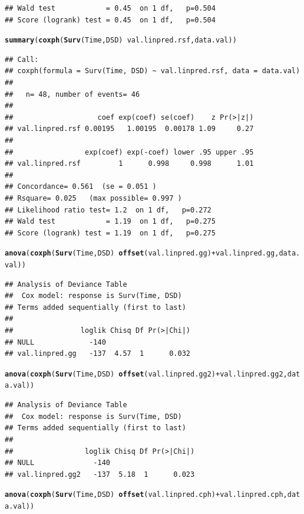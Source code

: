 \documentclass{article}\usepackage[]{graphicx}\usepackage[]{color}
\makeatletter
\newcommand{\hlopt}[1]{\textcolor[rgb]{0,0,0}{#1}}%
\newcommand{\hlstd}[1]{\textcolor[rgb]{0.345,0.345,0.345}{#1}}%
\newcommand{\hlkwd}[1]{\textcolor[rgb]{0.737,0.353,0.396}{\textbf{#1}}}%
\newenvironment{kframe}{%
 \def\at@end@of@kframe{}%
 \ifinner\ifhmode%
  \def\at@end@of@kframe{\end{minipage}}%
  \begin{minipage}{\columnwidth}%
 \fi\fi%
 \def\FrameCommand##1{\hskip\@totalleftmargin \hskip-\fboxsep
 \colorbox{shadecolor}{##1}\hskip-\fboxsep
     \hskip-\linewidth \hskip-\@totalleftmargin \hskip\columnwidth}%
 \MakeFramed {\advance\hsize-\width
   \@totalleftmargin\z@ \linewidth\hsize
   \@setminipage}}%
 {\par\unskip\endMakeFramed%
 \at@end@of@kframe}
\newenvironment{knitrout}{}{} %
\makeatother
\begin{document}
\begin{knitrout}
\begin{kframe}
\begin{verbatim}
## Wald test            = 0.45  on 1 df,   p=0.504
## Score (logrank) test = 0.45  on 1 df,   p=0.504
\end{verbatim}
\begin{alltt}
\hlkwd{summary}\hlstd{(}\hlkwd{coxph}\hlstd{(}\hlkwd{Surv}\hlstd{(Time, DSD)} \hlopt{~} \hlstd{val.linpred.rsf, data.val))}
\end{alltt}
\begin{verbatim}
## Call:
## coxph(formula = Surv(Time, DSD) ~ val.linpred.rsf, data = data.val)
## 
##   n= 48, number of events= 46 
## 
##                    coef exp(coef) se(coef)    z Pr(>|z|)
## val.linpred.rsf 0.00195   1.00195  0.00178 1.09     0.27
## 
##                 exp(coef) exp(-coef) lower .95 upper .95
## val.linpred.rsf         1      0.998     0.998      1.01
## 
## Concordance= 0.561  (se = 0.051 )
## Rsquare= 0.025   (max possible= 0.997 )
## Likelihood ratio test= 1.2  on 1 df,   p=0.272
## Wald test            = 1.19  on 1 df,   p=0.275
## Score (logrank) test = 1.19  on 1 df,   p=0.275
\end{verbatim}
\begin{alltt}
\hlkwd{anova}\hlstd{(}\hlkwd{coxph}\hlstd{(}\hlkwd{Surv}\hlstd{(Time, DSD)} \hlopt{~} \hlkwd{offset}\hlstd{(val.linpred.gg)} \hlopt{+} \hlstd{val.linpred.gg, data.val))}
\end{alltt}
\begin{verbatim}
## Analysis of Deviance Table
##  Cox model: response is Surv(Time, DSD)
## Terms added sequentially (first to last)
## 
##                loglik Chisq Df Pr(>|Chi|)
## NULL             -140                    
## val.linpred.gg   -137  4.57  1      0.032
\end{verbatim}
\begin{alltt}
\hlkwd{anova}\hlstd{(}\hlkwd{coxph}\hlstd{(}\hlkwd{Surv}\hlstd{(Time, DSD)} \hlopt{~} \hlkwd{offset}\hlstd{(val.linpred.gg2)} \hlopt{+} \hlstd{val.linpred.gg2, data.val))}
\end{alltt}
\begin{verbatim}
## Analysis of Deviance Table
##  Cox model: response is Surv(Time, DSD)
## Terms added sequentially (first to last)
## 
##                 loglik Chisq Df Pr(>|Chi|)
## NULL              -140                    
## val.linpred.gg2   -137  5.18  1      0.023
\end{verbatim}
\begin{alltt}
\hlkwd{anova}\hlstd{(}\hlkwd{coxph}\hlstd{(}\hlkwd{Surv}\hlstd{(Time, DSD)} \hlopt{~} \hlkwd{offset}\hlstd{(val.linpred.cph)} \hlopt{+} \hlstd{val.linpred.cph, data.val))}

\end{alltt}
\end{kframe}
\end{knitrout}
\end{document}
